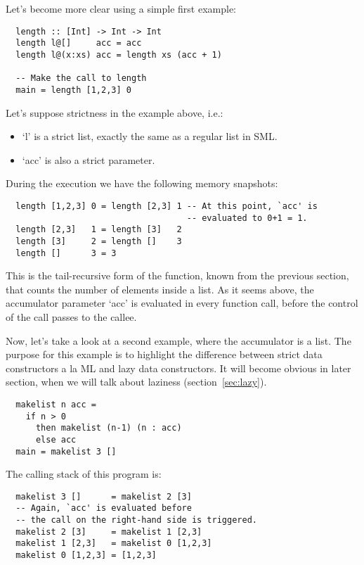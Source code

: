 \documentclass[diploma]{softlab-thesis}
\begin{document}
Let's become more clear using a simple first example:
\begin{verbatim}
  length :: [Int] -> Int -> Int
  length l@[]     acc = acc 
  length l@(x:xs) acc = length xs (acc + 1)

  -- Make the call to length
  main = length [1,2,3] 0
\end{verbatim}

Let's suppose strictness in the example above, i.e.:
\begin{itemize}
  \item `l' is a strict list, exactly the same as a regular list in SML.
  \item  `acc' is also a strict parameter. 
\end{itemize}

During the execution we have the following memory snapshots:
\begin{verbatim}
  length [1,2,3] 0 = length [2,3] 1 -- At this point, `acc' is 
                                    -- evaluated to 0+1 = 1.
  length [2,3]   1 = length [3]   2
  length [3]     2 = length []    3
  length []      3 = 3
\end{verbatim}

This is the tail-recursive form of the function, known from the previous section, that counts the number 
of elements inside a list. As it seems above, the accumulator parameter `acc' is evaluated in every 
function call, before the control of the call passes to the callee.

Now, let's take a look at a second example, where the accumulator is a list. The purpose for this 
example is to highlight the difference between strict data constructors a la ML and lazy data constructors.
It will become obvious in later section, when we will talk about laziness (section~\ref{sec:lazy}).

\begin{verbatim}
  makelist n acc = 
    if n > 0 
      then makelist (n-1) (n : acc)
      else acc
  main = makelist 3 []
\end{verbatim}

The calling stack of this program is:
\begin{verbatim}
  makelist 3 []      = makelist 2 [3] 
  -- Again, `acc' is evaluated before 
  -- the call on the right-hand side is triggered.
  makelist 2 [3]     = makelist 1 [2,3]
  makelist 1 [2,3]   = makelist 0 [1,2,3]
  makelist 0 [1,2,3] = [1,2,3]
\end{verbatim}
\end{document}
